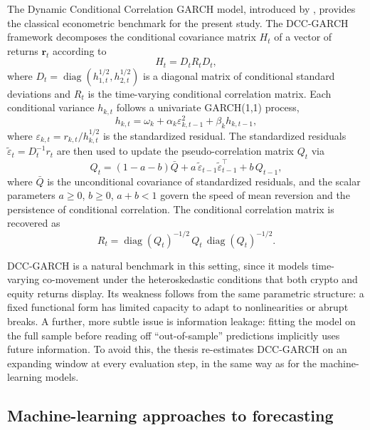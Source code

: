 The Dynamic Conditional Correlation GARCH model, introduced by \textcite{engle2002}, provides the classical econometric benchmark for the present study. The DCC-GARCH framework decomposes the conditional covariance matrix $H_t$ of a vector of returns $\mathbf{r}_t$ according to
\begin{equation}
    H_t = D_t R_t D_t,
\end{equation}
where $D_t = \operatorname{diag}(h_{1,t}^{1/2}, h_{2,t}^{1/2})$ is a diagonal matrix of conditional standard deviations and $R_t$ is the time-varying conditional correlation matrix. Each conditional variance $h_{k,t}$ follows a univariate GARCH(1,1) process,
\begin{equation}
    h_{k,t} = \omega_k + \alpha_k \varepsilon_{k,t-1}^{2} + \beta_k h_{k,t-1},
\end{equation}
where $\varepsilon_{k,t} = r_{k,t}/h_{k,t}^{1/2}$ is the standardized residual. The standardized residuals $\tilde{\varepsilon}_t = D_t^{-1} r_t$ are then used to update the pseudo-correlation matrix $Q_t$ via
\begin{equation}
    Q_t = (1 - a - b)\bar{Q} + a\,\tilde{\varepsilon}_{t-1}\tilde{\varepsilon}_{t-1}^{\top} + b\, Q_{t-1},
\end{equation}
where $\bar{Q}$ is the unconditional covariance of standardized residuals, and the scalar parameters $a \geq 0$, $b \geq 0$, $a + b < 1$ govern the speed of mean reversion and the persistence of conditional correlation. The conditional correlation matrix is recovered as
\begin{equation}
    R_t = \operatorname{diag}(Q_t)^{-1/2}\, Q_t\, \operatorname{diag}(Q_t)^{-1/2}.
\end{equation}

DCC-GARCH is a natural benchmark in this setting, since it models time-varying co-movement under the heteroskedastic conditions that both crypto and equity returns display. Its weakness follows from the same parametric structure: a fixed functional form has limited capacity to adapt to nonlinearities or abrupt breaks. A further, more subtle issue is information leakage: fitting the model on the full sample before reading off ``out-of-sample'' predictions implicitly uses future information. To avoid this, the thesis re-estimates DCC-GARCH on an expanding window at every evaluation step, in the same way as for the machine-learning models.

\subsection{Machine-learning approaches to forecasting}

